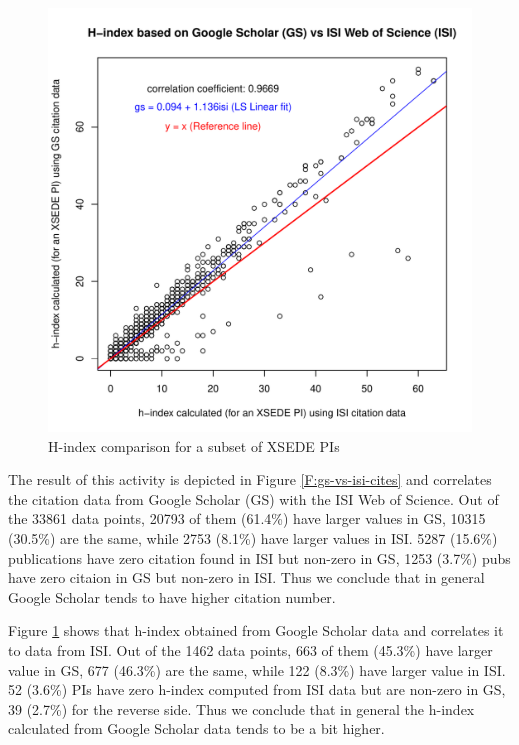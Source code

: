 \documentclass{sig-alternate}
\begin{document}
\begin{figure}[!htb] 
  \centering 
    \includegraphics[width=1.0\columnwidth]{images/11_gs_vs_isi_hindex.pdf} 
  \caption{H-index comparison for a subset of XSEDE PIs}\label{F:gs-vs-isi-hindex} 
\end{figure} 
 
The result of this activity is depicted in Figure \ref{F:gs-vs-isi-cites} and correlates the citation data from Google Scholar (GS) with the ISI Web of Science. Out of the 33861 data points, 20793 of them (61.4\%) have larger values in GS, 10315 (30.5\%) are the same, while 2753 (8.1\%) have larger values in ISI. 5287 (15.6\%) publications have zero citation found in ISI but non-zero in GS, 1253 (3.7\%) pubs have zero citaion in GS but non-zero in ISI. Thus we conclude that in general Google Scholar tends to have higher citation number. 
 
Figure \ref{F:gs-vs-isi-hindex} shows that h-index obtained from Google Scholar data and correlates it to data from ISI. Out of the 1462 data points, 663 of them (45.3\%) have larger value in GS, 677 (46.3\%) are the same, while 122 (8.3\%) have larger value in ISI. 52 (3.6\%) PIs have zero h-index computed from ISI data but are non-zero in GS, 39 (2.7\%) for the reverse side. Thus we conclude that in general the h-index calculated from Google Scholar data tends to be a bit higher. 
 
\end{document}
